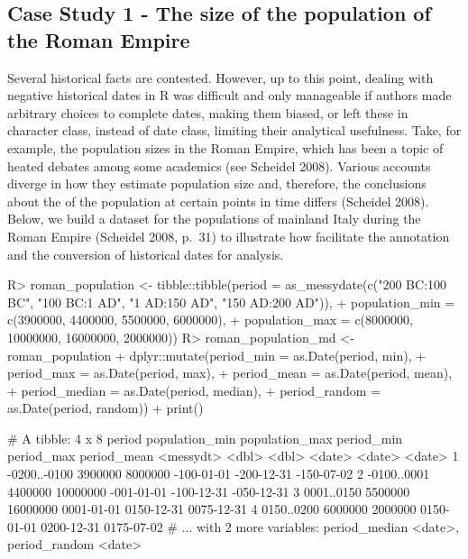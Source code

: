 \documentclass[
]{jss}
\begin{document}
\hypertarget{case-study-1---the-size-of-the-population-of-the-roman-empire}{%
\subsection{Case Study 1 - The size of the population of the Roman
Empire}\label{case-study-1---the-size-of-the-population-of-the-roman-empire}}

Several historical facts are contested. However, up to this point,
dealing with negative historical dates in R was difficult and only
manageable if authors made arbitrary choices to complete dates, making
them biased, or left these in character class, instead of date class,
limiting their analytical usefulness. Take, for example, the population
sizes in the Roman Empire, which has been a topic of heated debates
among some academics (see Scheidel 2008). Various accounts diverge in
how they estimate population size and, therefore, the conclusions about
the of the population at certain points in time differs (Scheidel 2008).
Below, we build a dataset for the populations of mainland Italy during
the Roman Empire (Scheidel 2008, p.~31) to illustrate how
 facilitate the annotation and the conversion of
historical dates for analysis.

\begin{CodeChunk}
\begin{CodeInput}
R> roman_population <- tibble::tibble(period = as_messydate(c("200 BC:100 BC", "100 BC:1 AD", "1 AD:150 AD", "150 AD:200 AD")),
+                                    population_min = c(3900000, 4400000, 5500000, 6000000),
+                                    population_max = c(8000000, 10000000, 16000000, 2000000))
R> roman_population_md <- roman_population %
+   dplyr::mutate(period_min = as.Date(period, min),
+                 period_max = as.Date(period, max),
+                 period_mean = as.Date(period, mean),
+                 period_median = as.Date(period, median),
+                 period_random = as.Date(period, random)) %
+   print()
\end{CodeInput}
\begin{CodeOutput}
# A tibble: 4 x 8
  period       population_min population_max period_min period_max period_mean
  <messydt>             <dbl>          <dbl> <date>     <date>     <date>     
1 -0200..-0100        3900000        8000000 -100-01-01 -200-12-31 -150-07-02 
2 -0100..0001         4400000       10000000 -001-01-01 -100-12-31 -050-12-31 
3 0001..0150          5500000       16000000 0001-01-01 0150-12-31 0075-12-31 
4 0150..0200          6000000        2000000 0150-01-01 0200-12-31 0175-07-02 
# ... with 2 more variables: period_median <date>, period_random <date>
\end{CodeOutput}
\end{CodeChunk}
\end{document}
